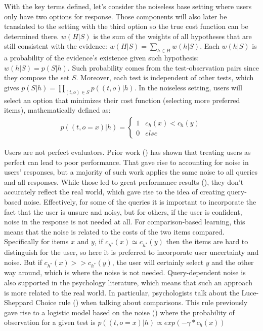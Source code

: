 \documentclass[
  letterpaper,
  numbers=noenddot,
  DIV=11]{scrreprt}
\theoremstyle{plain}
\theoremstyle{definition}
\theoremstyle{remark}
\begin{document}
With the key terms defined, let's consider the noiseless base setting
where users only have two options for response. Those components will
also later be translated to the setting with the third option so the
true cost function can be determined there. \(w(H|S)\) is the sum of the
weights of all hypotheses that are still consistent with the evidence:
\(w(H|S) = \sum_{h \in H} w(h | S)\). Each \(w(h|S)\) is a probability
of the evidence's existence given such hypothesis: \(w(h|S) = p(S|h)\).
Such probability comes from the test-observation pairs since they
compose the set \(S\). Moreover, each test is independent of other
tests, which gives \(p(S|h) = \prod_{(t,o) \in S} p((t,o) | h)\). In the
noiseless setting, users will select an option that minimizes their cost
function (selecting more preferred items), mathematically defined as:
\[\begin{aligned}
    p((t, o = x) | h) = 
    \begin{cases}
        1 & c_h(x) < c_h(y)\\
        0 & else
    \end{cases}
\end{aligned}\]

Users are not perfect evaluators. Prior work
() has shown that
treating users as perfect can lead to poor performance. That gave rise
to accounting for noise in users' responses, but a majority of such work
applies the same noise to all queries and all responses. While those led
to great performance results (), they don't accurately reflect the real world, which gave
rise to the idea of creating query-based noise. Effectively, for some of
the queries it is important to incorporate the fact that the user is
unsure and noisy, but for others, if the user is confident, noise in the
response is not needed at all. For comparison-based learning, this means
that the noise is related to the costs of the two items compared.
Specifically for items \(x\) and \(y\), if
\(c_{h^*}(x) \simeq c_{h^*}(y)\) then the items are hard to distinguish
for the user, so here it is preferred to incorporate user uncertainty
and noise. But if \(c_{h^*}(x) >> c_{h^*}(y)\), the user will certainly
select \(y\) and the other way around, which is where the noise is not
needed. Query-dependent noise is also supported in the psychology
literature, which means that such an approach is more related to the
real world. In particular, psychologists talk about the Luce-Sheppard
Choice rule () when talking about
comparisons. This rule previously gave rise to a logistic model based on
the noise () where
the probability of observation for a given test is
\(p((t, o = x) | h) \propto exp(-\gamma * c_h(x))\)
\end{document}
